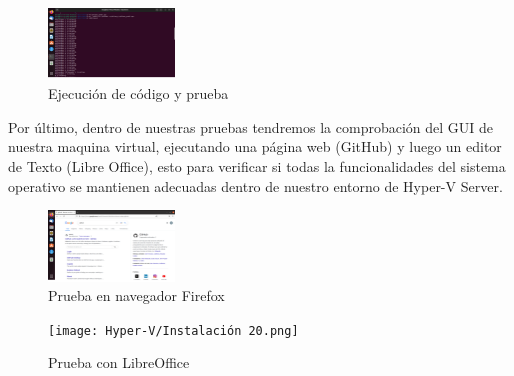 \documentclass[journal]{IEEEtran}
\begin{document}
\begin{figure}[htbp]
  \centering
  \includegraphics[width=0.3\textwidth]{Hyper-V/10.png}
  \caption{Ejecución de código y prueba}
\end{figure}


\FloatBarrier %

Por último, dentro de nuestras pruebas tendremos la comprobación del GUI de nuestra maquina virtual, ejecutando una página web (GitHub) y luego un editor de Texto (Libre Office), esto para verificar si todas la funcionalidades del sistema operativo se mantienen adecuadas dentro de nuestro entorno de Hyper-V Server.\\

\begin{figure}[htbp]
  \centering
  \includegraphics[width=0.3\textwidth]{Hyper-V/11.png}
  \caption{Prueba en navegador Firefox}
\end{figure}

\begin{figure}[htbp]
  \centering
  \texttt{[image: Hyper-V/Instalación 20.png]}
  \caption{Prueba con LibreOffice}
\end{figure}

\FloatBarrier %
\end{document}
